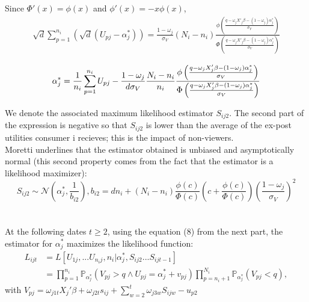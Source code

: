 	Since $\Phi'(x)=\phi(x)$ and $\phi'(x)=-x\phi(x)$,
	\begin{align*}	
		\sqrt{d}\sum_{p=1}^{n_{i}}(\sqrt{d}(U_{p j}-\alpha_{j}^{*}))
		=\frac{1-\omega_{j}}{\sigma_{V}}(N_{i}-n_{i})\frac{\phi\left(\frac{q-\omega_{j}X'_{j}\beta-(1-\omega_{j})\alpha_{j}^{*}}{\sigma_{V}}\right)}{\Phi\left(\frac{q-\omega_{j}X'_{j}\beta-(1-\omega_{j})\alpha_{j}^{*}}{\sigma_{V}}\right)}\\	
	\end{align*}
	\begin{equation}
		\alpha_{j}^{*}=\frac{1}{n_{i}}\sum_{p=1}^{n_{i}}U_{p j}-\frac{1-\omega_{j}}{d\sigma_{V}}\frac{N_{i}-n_{i}}{n_{i}}\frac{\phi\left(\frac{q-\omega_{j}X'_{j}\beta-(1-\omega_{j})\alpha_{j}^{*}}{\sigma_{V}}\right)}{\Phi\left(\frac{q-\omega_{j}X'_{j}\beta-(1-\omega_{j})\alpha_{j}^{*}}{\sigma_{V}}\right)}\\
	\end{equation}
	
	We denote the associated maximum likelihood estimator $S_{i j 2}$. The second part of the expression is negative so that $S_{i j 2}$ is lower than the average of the ex-post utilities consumer i recieves; this is the impact of non-viewers.\\
	
	Moretti underlines that the estimator obtained is unbiased and asymptotically normal (this second property comes from the fact that the estimator is a likelihood maximizer): 
	\begin{equation}
		S_{i j 2}\sim\mathcal{N}(\alpha_{j}^{*}, \frac{1}{b_{i 2}}) , b_{i 2}=dn_{i}+(N_{i}-n_{i})\frac{\phi(c)}{\Phi(c)}\left(c+\frac{\phi(c)}{\Phi(c)}\right)(\frac{1-\omega_{j}}{\sigma_{V}})^{2}
	\end{equation}\\
	\\
	At the following dates $t\geqslant2$, using the equation (8) from the next part, the estimator for $\alpha_{j}^{*}$ maximizes the likelihood function:
	\begin{align*}
		L_{i j t}&=L[U_{1 j},...U_{n_{i} j}, n_{i}|\alpha_{j}^{*},S_{i j 2}...S_{i j t-1}]\\
		&=\prod_{p=1}^{n_{i}}\mathbb{P}_{\alpha_{j}^{*}}(V_{p j}>q \wedge U_{p j}=\alpha_{j}^{*}+v_{p j})\prod_{p=n_{i}+1}^{N_{i}}\mathbb{P}_{\alpha_{j}^{*}}(V_{p j}<q),
	\end{align*}
	with $V_{p j}=\omega_{j 1 t}X_{j}'\beta +\omega_{j 2 t}s_{i j}+\sum_{w=2}^{t}\omega_{j 3 w}S_{i j w}-u_{p 2}$
	
